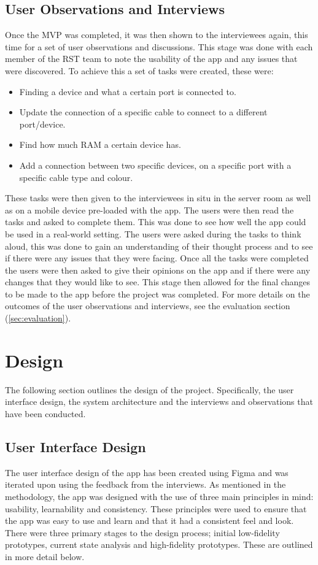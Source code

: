 \documentclass [11pt,a4paper]{article}
\begin{document}
\subsection{User Observations and Interviews}
\label{sec:user_observations_and_interviews}
Once the MVP was completed, it was then shown to the interviewees again, this time for a set of user observations and discussions. This stage was done with each member of the RST team to note the usability of the app and any issues that were discovered. To achieve this a set of tasks were created, these were:
\begin{itemize}
    \item Finding a device and what a certain port is connected to.
    \item Update the connection of a specific cable to connect to a different port/device.
    \item Find how much RAM a certain device has.
    \item Add a connection between two specific devices, on a specific port with a specific cable type and colour.
\end{itemize}

These tasks were then given to the interviewees in situ in the server room as well as on a mobile device pre-loaded with the app. The users were then read the tasks and asked to complete them. This was done to see how well the app could be used in a real-world setting. The users were asked during the tasks to think aloud, this was done to gain an understanding of their thought process and to see if there were any issues that they were facing. Once all the tasks were completed the users were then asked to give their opinions on the app and if there were any changes that they would like to see. This stage then allowed for the final changes to be made to the app before the project was completed. For more details on the outcomes of the user observations and interviews, see the evaluation section (\ref{sec:evaluation}).

\section{Design}
\label{sec:design}
The following section outlines the design of the project. Specifically, the user interface design, the system architecture and the interviews and observations that have been conducted.

\subsection{User Interface Design}
\label{sec:ui_design}
The user interface design of the app has been created using Figma and was iterated upon using the feedback from the interviews. As mentioned in the methodology, the app was designed with the use of three main principles in mind: usability, learnability and consistency. These principles were used to ensure that the app was easy to use and learn and that it had a consistent feel and look. There were three primary stages to the design process; initial low-fidelity prototypes, current state analysis and high-fidelity prototypes. These are outlined in more detail below. 
\end{document}
